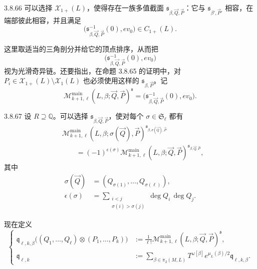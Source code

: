 \begin{proposition}{3.8.66}\label{prop:3-8-66}
可以选择 $\mathcal X_{1+}(L)$，使得存在一族多值截面
$\mathfrak s_{\beta,\vec Q,\vec P}$：它与
$\mathfrak s_{\beta',\vec P'}$ 相容，在端部彼此相容，并且满足
\[
 \bigl(
 \mathfrak s_{\beta,\vec Q,\vec P}^{-1}(0),ev_0
 \bigr)
 \in C_{1+}(L).
\]
\end{proposition}

这里取适当的三角剖分并给它的顶点排序，从而把
\[
 \bigl(
 \mathfrak s_{\beta,\vec Q,\vec P}^{-1}(0),ev_0
 \bigr)
\]
视为光滑奇异链。还要指出，在命题 3.8.65 的证明中，对
$P_i\in\mathcal X_{1+}(L)\setminus\mathcal X_1(L)$ 也必须使用这样的
$\mathfrak s_{\beta,\vec P}$。记
\[
 \mathcal M_{k+1,\ell}^{\mathrm{main}}
 (L,\beta;\vec Q,\vec P)^{\mathfrak s}
 =
 \bigl(
 \mathfrak s_{\beta,\vec Q,\vec P}^{-1}(0),ev_0
 \bigr).
\]

\begin{lemma}{3.8.67}\label{lem:3-8-67}
设 $R\supseteq\mathbb Q$。可以选择
$\mathfrak s_{\beta,\vec Q,\vec P}$，使对每个
$\sigma\in\mathfrak S_\ell$ 都有
\[
\begin{aligned}
 &\mathcal M_{k+1,\ell}^{\mathrm{main}}
 (L,\beta;\sigma(\vec Q),\vec P)
 ^{\mathfrak s_{\beta,\sigma(\vec Q),\vec P}}\\
 &\qquad=
 (-1)^{\epsilon(\sigma)}
 \mathcal M_{k+1,\ell}^{\mathrm{main}}
 (L,\beta;\vec Q,\vec P)
 ^{\mathfrak s_{\beta,\vec Q,\vec P}},
\end{aligned}
\]
其中
\[
\begin{aligned}
 \sigma(\vec Q)
 &=
 (Q_{\sigma(1)},\ldots,Q_{\sigma(\ell)}),\\
 \epsilon(\sigma)
 &=
 \sum_{\substack{i<j\\\sigma(i)>\sigma(j)}}
 \deg Q_i\,\deg Q_j.
\end{aligned}
\]
\end{lemma}

现在定义
\begin{equation}
\left\{
\begin{aligned}
 \mathfrak q_{\ell,k,\beta}
 \bigl(
 (Q_1,\ldots,Q_\ell)\otimes(P_1,\ldots,P_k)
 \bigr)
 &:=
 \frac1{\ell!}
 \mathcal M_{k+1,\ell}^{\mathrm{main}}
 (L,\beta;\vec Q,\vec P)^{\mathfrak s},\\
 \mathfrak q_{\ell,k}
 &:=
 \sum_{\beta\in\pi_2(M,L)}
 T^{\omega[\beta]}e^{\mu_L(\beta)/2}
 \mathfrak q_{\ell,k,\beta}.
\end{aligned}
\right.
\tag{3.8.68}\label{eq:3-8-68}
\end{equation}

